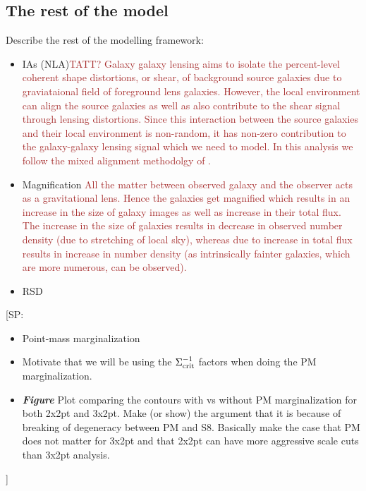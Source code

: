 \documentclass[fleqn,usenatbib]{mnras}
\newcommand{\SP}[1]{{\color{brown}[SP: #1]}}
\newcommand{\brown}[1]{\textcolor{brown}{#1}}
\begin{document}
\subsection{The rest of the model}
\label{sec:full_pk_th}
Describe the rest of the modelling framework:
\begin{itemize}
    \item IAs (NLA)\brown{TATT?}
    \brown{Galaxy galaxy lensing aims to isolate the percent-level coherent shape distortions, or shear, of background source galaxies due to graviataional field of foreground lens galaxies. However, the local environment can align the source galaxies as well as also contribute to the shear signal through lensing distortions. Since this interaction between the source galaxies and their local environment is non-random, it has non-zero contribution to the galaxy-galaxy lensing signal which we need to model. In this analysis we follow the mixed alignment methodolgy of \cite{Blazek_2019}. }
    \item Magnification
    \brown{All the matter between observed galaxy and the observer acts as a gravitational lens. Hence the galaxies get magnified which results in an increase in the size of galaxy images as well as increase in their total flux. The increase in the size of galaxies results in decrease in observed number density (due to stretching of local sky), whereas due to increase in total flux results in increase in number density (as intrinsically fainter galaxies, which are more numerous, can be observed).  }
    \item RSD
    \brown{}
\end{itemize}    

    
    \SP{
    \begin{itemize}
    \item Point-mass marginalization 
    \item  Motivate that we will be using the $\Sigma^{-1}_{\rm crit}$ factors when doing the PM marginalization. 
    \item \textbf{\textit{Figure}} Plot comparing the contours with vs without PM marginalization for both 2x2pt and 3x2pt. Make (or show) the argument that it is because of breaking of degeneracy between PM and S8. Basically make the case that PM does not matter for 3x2pt and that 2x2pt can have more aggressive scale cuts than 3x2pt analysis.
    \end{itemize}
    }
    
\end{document}
